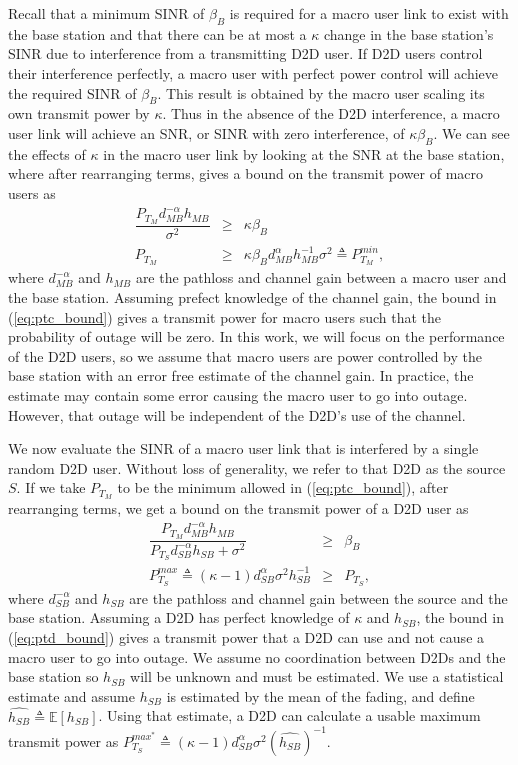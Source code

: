 \documentclass[10pt, final, journal, letterpaper,oneside, twocolumn]{IEEEtran}
\begin{document}
Recall that a minimum SINR of $\beta_B$ is required for a macro user link to exist with the base station and that there can be at most a $\kappa$ change in the base station's SINR due to interference from a transmitting D2D user.  If D2D users control their interference perfectly, a macro user with perfect power control will achieve the required SINR of $\beta_B$.  This result is obtained by the macro user scaling its own transmit power by $\kappa$.  Thus in the absence of the D2D interference, a macro user link will achieve an SNR, or SINR with zero interference, of $\kappa\beta_B$.  We can see the effects of $\kappa$ in the macro user link by looking at the SNR at the base station, where after rearranging terms, gives a bound on the transmit power of macro users as
\begin{eqnarray}
\dfrac{P_{T_{M}}d_{MB}^{-\alpha}h_{MB}}{\sigma^2} &\geq& \kappa \beta_{B} \nonumber
\\
P_{T_{M}} &\geq& \kappa  \beta_{B} d_{MB}^{\alpha}h_{MB}^{-1} \sigma^2 \triangleq P_{T_M}^{min},
\label{eq:ptc_bound}
\end{eqnarray}
where $d_{MB}^{-\alpha}$ and $h_{MB}$ are the pathloss and channel gain between a macro user and the base station.  Assuming prefect knowledge of the channel gain, the bound in (\ref{eq:ptc_bound}) gives a transmit power for macro users such that the probability of outage will be zero.  In this work, we will focus on the performance of the D2D users, so we assume that macro users are power controlled by the base station with an error free estimate of the channel gain.  In practice, the estimate may contain some error causing the macro user to go into outage.  However, that outage will be independent of the D2D's use of the channel.  


We now evaluate the SINR of a macro user link that is interfered by a single random D2D user. Without loss of generality, we refer to that D2D as the source $S$.  If we take $P_{T_{M}}$ to be the minimum allowed in (\ref{eq:ptc_bound}), after rearranging terms, we get a bound on the transmit power of a D2D user as
\begin{eqnarray}
\dfrac{P_{T_{M}}d_{MB}^{-\alpha}h_{MB}}{P_{T_{S}}d_{SB}^{-\alpha}h_{SB}+\sigma^2} &\geq& \beta_{B} \nonumber
\\
P_{T_{S}}^{max} \triangleq(\kappa-1)d_{SB}^{\alpha}\sigma^2h_{SB}^{-1} &\geq& P_{T_{S}},
\label{eq:ptd_bound}
\end{eqnarray}
where $d_{SB}^{-\alpha}$ and $h_{SB}$ are the pathloss and channel gain between the source and the base station.  Assuming a D2D has perfect knowledge of $\kappa$ and $h_{SB}$, the bound in (\ref{eq:ptd_bound}) gives a transmit power that a D2D can use and not cause a macro user to go into outage.  We assume no coordination between D2Ds and the base station so $h_{SB}$ will be unknown and must be estimated.  We use a statistical estimate and assume $h_{SB}$ is estimated by the mean of the fading, and define $\widehat{h_{SB}} \triangleq \mathbb{E}[h_{SB}]$.  Using that estimate, a D2D can calculate a usable maximum transmit power as $P_{T_{S}}^{max^*} \triangleq (\kappa-1)d_{SB}^{\alpha}\sigma^2(\widehat{h_{SB}})^{-1}$.  
\end{document}
